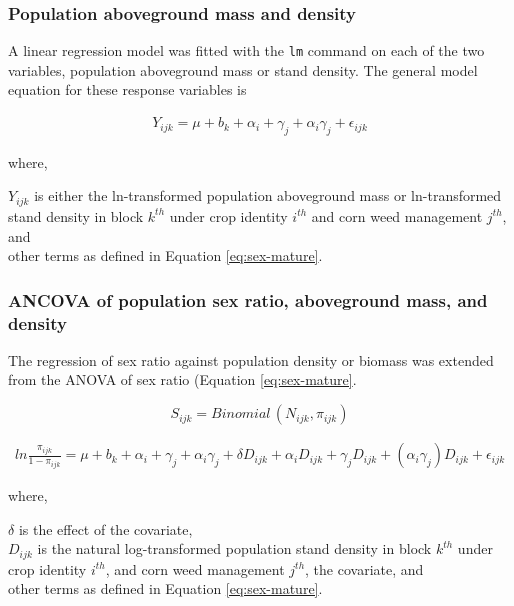 \documentclass[utf8]{frontiersSCNS}
\begin{document}
\hypertarget{population-aboveground-mass-and-density-1}{%
\subsubsection*{Population aboveground mass and density}\label{population-aboveground-mass-and-density-1}}

A linear regression model was fitted with the \texttt{lm} command on each of the two variables, population aboveground mass or stand density. The general model equation for these response variables is

\begin{align}
Y_{ijk} = \mu + b_k + \alpha_i + \gamma_j +\alpha_i \gamma_j + \epsilon_{ijk} \label{eq:pop-mass-dens}
\end{align}

where,

\(Y_{ijk}\) is either the ln-transformed population aboveground mass or ln-transformed stand density in block \(k^{th}\) under crop identity \(i^{th}\) and corn weed management \(j^{th}\), and\\
other terms as defined in Equation \eqref{eq:sex-mature}.

\hypertarget{ancova-of-population-sex-ratio-aboveground-mass-and-density}{%
\subsubsection*{ANCOVA of population sex ratio, aboveground mass, and density}\label{ancova-of-population-sex-ratio-aboveground-mass-and-density}}

The regression of sex ratio against population density or biomass was extended from the ANOVA of sex ratio (Equation \eqref{eq:sex-mature}.

\[ S_{ijk} = Binomial\,(N_{ijk},\pi_{ijk}) \]

\begin{align}
ln \frac{\pi_{ijk}}{1-\pi_{ijk}} = \mu + b_k + \alpha_i + \gamma_j +\alpha_i \gamma_j + \delta D_{ijk}  + \alpha_i D_{ijk} + \gamma_j D_{ijk} + (\alpha_i \gamma_j)D_{ijk} + \epsilon_{ijk} \label{eq:sex-mature-anc}
\end{align}

where,

\(\delta\) is the effect of the covariate,\\
\(D_{ijk}\) is the natural log-transformed population stand density in block \(k^{th}\) under crop identity \(i^{th}\), and corn weed management \(j^{th}\), the covariate, and\\
other terms as defined in Equation \eqref{eq:sex-mature}.
\end{document}
